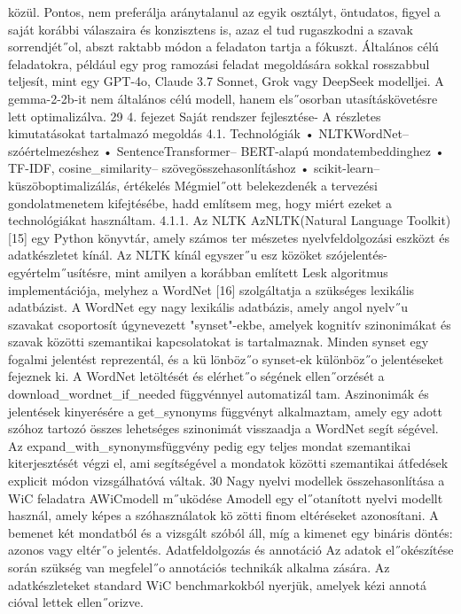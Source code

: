 \documentclass[12pt]{report}
\theoremstyle{definition}
\begin{document}
 közül. Pontos, nem preferálja aránytalanul az egyik osztályt, öntudatos, figyel a saját
 korábbi válaszaira és konzisztens is, azaz el tud rugaszkodni a szavak sorrendjét˝ol, abszt
raktabb módon a feladaton tartja a fókuszt. Általános célú feladatokra, például egy prog
ramozási feladat megoldására sokkal rosszabbul teljesít, mint egy GPT-4o, Claude 3.7
 Sonnet, Grok vagy DeepSeek modelljei. A gemma-2-2b-it nem általános célú modell,
 hanem els˝osorban utasításkövetésre lett optimalizálva.
 29
4. fejezet
 Saját rendszer fejlesztése- A részletes
 kimutatásokat tartalmazó megoldás
 4.1. Technológiák
 • NLTKWordNet– szóértelmezéshez
 • SentenceTransformer– BERT-alapú mondatembeddinghez
 • TF-IDF, cosine_similarity– szövegösszehasonlításhoz
 • scikit-learn– küszöboptimalizálás, értékelés
 Mégmiel˝ott belekezdenék a tervezési gondolatmenetem kifejtésébe, hadd említsem
 meg, hogy miért ezeket a technológiákat használtam.
 4.1.1. Az NLTK
 AzNLTK(Natural Language Toolkit) [15] egy Python könyvtár, amely számos ter
mészetes nyelvfeldolgozási eszközt és adatkészletet kínál. Az NLTK kínál egyszer˝u esz
közöket szójelentés-egyértelm˝usítésre, mint amilyen a korábban említett Lesk algoritmus
 implementációja, melyhez a WordNet [16] szolgáltatja a szükséges lexikális adatbázist.
 A WordNet egy nagy lexikális adatbázis, amely angol nyelv˝u szavakat csoportosít
 úgynevezett "synset"-ekbe, amelyek kognitív szinonimákat és szavak közötti szemantikai
 kapcsolatokat is tartalmaznak. Minden synset egy fogalmi jelentést reprezentál, és a kü
lönböz˝o synset-ek különböz˝o jelentéseket fejeznek ki. A WordNet letöltését és elérhet˝o
ségének ellen˝orzését a download_wordnet_if_needed függvénnyel automatizál
tam. Aszinonimák és jelentések kinyerésére a get_synonyms függvényt alkalmaztam,
 amely egy adott szóhoz tartozó összes lehetséges szinonimát visszaadja a WordNet segít
ségével. Az expand_with_synonymsfüggvény pedig egy teljes mondat szemantikai
 kiterjesztését végzi el, ami segítségével a mondatok közötti szemantikai átfedések explicit
 módon vizsgálhatóvá váltak.
 30
Nagy nyelvi modellek összehasonlítása a WiC feladatra
 AWiCmodell m˝uködése
 Amodell egy el˝otanított nyelvi modellt használ, amely képes a szóhasználatok kö
zötti finom eltéréseket azonosítani. A bemenet két mondatból és a vizsgált szóból áll, míg
 a kimenet egy bináris döntés: azonos vagy eltér˝o jelentés.
 Adatfeldolgozás és annotáció
 Az adatok el˝okészítése során szükség van megfelel˝o annotációs technikák alkalma
zására. Az adatkészleteket standard WiC benchmarkokból nyerjük, amelyek kézi annotá
cióval lettek ellen˝orizve.
\end{document}
